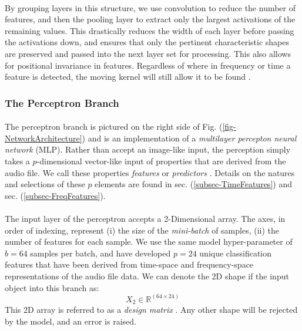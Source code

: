\documentclass[12pt,letterpaper]{article}
\begin{document}
\paragraph*{}By grouping layers in this structure, we use convolution to reduce the number of features, and then the pooling layer to extract only the largest activations of the remaining values. This drastically reduces the width of each layer before passing the activations down, and ensures that only the pertinent characteristic shapes are preserved and passed into the next layer set for processing. This also allows for positional invariance in features. Regardless of where in frequency or time a feature is detected, the moving kernel will still allow it to be found \cite{Goodfellow,Loy}.


\subsubsection{The Perceptron Branch}

\paragraph*{}The perceptron branch is pictured on the right side of Fig. (\ref{fig-NetworkArchitecture}) and is an implementation of a \textit{multilayer percepton neural network} (MLP). Rather than accept an image-like input, the perception simply takes a $p$-dimensional vector-like input of properties that are derived from the audio file. We call these properties \textit{features} or \textit{predictors} \cite{Geron,Khan,Serizel}. Details on the natures and selections of these $p$ elements are found in sec. (\ref{subsec-TimeFeatures}) and sec. (\ref{subsec-FreqFeatures}).

\paragraph*{}The input layer of the perceptron accepts a 2-Dimensional array. The axes, in order of indexing, represent (i) the size of the \textit{mini-batch} of samples, (ii) the number of features for each sample. We use the same model hyper-parameter of $b = 64$ samples per batch, and have developed $p = 24$ unique classification features that have been derived from time-space and frequency-space representations of the audio file data. We can denote the 2D shape if the input object into this branch as:
\begin{equation}
\label{eqn-shapeX2}
X_2 \in \mathbb{R}^{(64 \times 24)}
\end{equation}
This 2D array is referred to as a \textit{design matrix} \cite{James,Loy}. Any other shape will be rejected by the model, and an error is raised.
\end{document}
